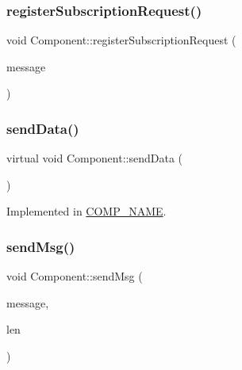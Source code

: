 \mbox{\label{classComponent_aaa5c27b493d39887885adb3dd21e2224}} 
\subsubsection{\texorpdfstring{register\+Subscription\+Request()}{registerSubscriptionRequest()}}
{\footnotesize\ttfamily void Component\+::register\+Subscription\+Request (\begin{DoxyParamCaption}\item[{\hyperlink{structSpaMessage}{Spa\+Message} $\ast$}]{message }\end{DoxyParamCaption})}

\mbox{\label{classComponent_a492a20dc97b9563d80443dda2f1057ec}} 
\subsubsection{\texorpdfstring{send\+Data()}{sendData()}}
{\footnotesize\ttfamily virtual void Component\+::send\+Data (\begin{DoxyParamCaption}\item[{\hyperlink{structLogicalAddress}{Logical\+Address}}]{ }\end{DoxyParamCaption})\hspace{0.3cm}{\ttfamily [pure virtual]}}



Implemented in \hyperlink{classCOMP__NAME_ac981fe25a24ee01c160d08f0a970fab1}{C\+O\+M\+P\+\_\+\+N\+A\+ME}.

\mbox{\label{classComponent_a4fe6afd53663b5c1d3b60977024bc86a}} 
\subsubsection{\texorpdfstring{send\+Msg()}{sendMsg()}}
{\footnotesize\ttfamily void Component\+::send\+Msg (\begin{DoxyParamCaption}\item[{\hyperlink{structSpaMessage}{Spa\+Message} $\ast$}]{message,  }\item[{ssize\+\_\+t}]{len }\end{DoxyParamCaption})\hspace{0.3cm}{\ttfamily [inline]}}

